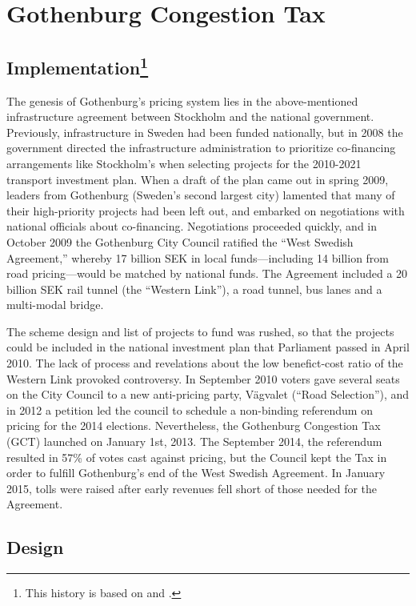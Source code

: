\section{Gothenburg Congestion Tax}\label{sec:gothenburg}

\subsection{Implementation\protect\footnote{This history is based on \citet{Borjesson2015} and \citet{Hysing2015b}.}}

The genesis of Gothenburg's pricing system lies in the above-mentioned infrastructure agreement between Stockholm and the national government. Previously, infrastructure in Sweden had been funded nationally, but in 2008 the government directed the infrastructure administration to prioritize co-financing arrangements like Stockholm's when selecting projects for the 2010-2021 transport investment plan. When a draft of the plan came out in spring 2009, leaders from Gothenburg (Sweden's second largest city) lamented that many of their high-priority projects had been left out, and embarked on negotiations with national officials about co-financing. Negotiations proceeded quickly, and in October 2009 the Gothenburg City Council ratified the ``West Swedish Agreement,'' whereby 17 billion SEK in local funds---including 14 billion from road pricing---would be matched by national funds. The Agreement included a 20 billion SEK rail tunnel (the ``Western Link''), a road tunnel, bus lanes and a multi-modal bridge. 

The scheme design and list of projects to fund was rushed, so that the projects could be included in the national investment plan that Parliament passed in April 2010. The lack of process and revelations about the low benefict-cost ratio of the Western Link provoked controversy. In September 2010 voters gave several seats on the City Council to a new anti-pricing party, Vägvalet (``Road Selection''), and in 2012 a petition led the council to schedule a non-binding referendum on pricing for the 2014 elections. Nevertheless,  the Gothenburg Congestion Tax (GCT) launched on January 1st, 2013. The September 2014, the referendum resulted in 57\% of votes cast against pricing, but the Council kept the Tax in order to fulfill Gothenburg's end of the West Swedish Agreement. In January 2015, tolls were raised after early revenues fell short of those needed for the Agreement.

\subsection{Design}

